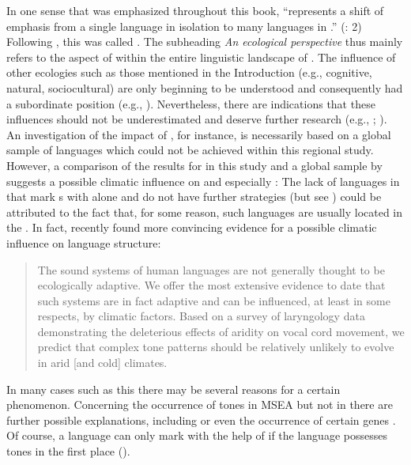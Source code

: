 In one sense that was emphasized throughout this book,  “represents a shift of emphasis from a single language in isolation to many languages in .” (\citealt{VoegelinVoegelin1964}: 2) Following \citet{SteffensenFill2014}, this was called \textit{}. The subheading \textit{An ecological perspective} thus mainly refers to the aspect of  within the entire linguistic landscape of . The influence of other ecologies such as those mentioned in the Introduction (e.g., cognitive, natural, sociocultural) are only beginning to be understood and consequently had a subordinate position (e.g., \citealt{DeBusser2015}). Nevertheless, there are indications that these influences should not be underestimated and deserve further research (e.g., \citealt{AxelsenManrubia2014}; \citealt{Everett2016}). An investigation of the impact of , for instance, is necessarily based on a global sample of languages which could not be achieved within this regional study. However, a comparison of the results for  in this study and a global sample by \citet{Dryer2013m} suggests a possible climatic influence on  and especially : The lack of languages in  that mark s with  alone and do not have further  strategies (but see ) could be attributed to the fact that, for some reason, such languages are usually located in the . In fact, \citet[1322]{Everett2015} recently found more convincing evidence for a possible climatic influence on language structure:

\begin{quote}
The sound systems of human languages are not generally thought to be ecologically adaptive. We offer the most extensive evidence to date that such systems are in fact adaptive and can be influenced, at least in some respects, by climatic factors. Based on a survey of laryngology data demonstrating the deleterious effects of aridity on vocal cord movement, we predict that complex tone patterns should be relatively unlikely to evolve in arid [and cold] climates.
\end{quote}

\largerpage
\noindent In many cases such as this there may be several reasons for a certain phenomenon. Concerning the occurrence of tones in MSEA but not in  there are further possible explanations, including  or even the occurrence of certain genes \citep{Dediu2011}. Of course, a language can only mark  with the help of  if the language possesses tones in the first place (\citealt[593]{HymanLeben2000}).

